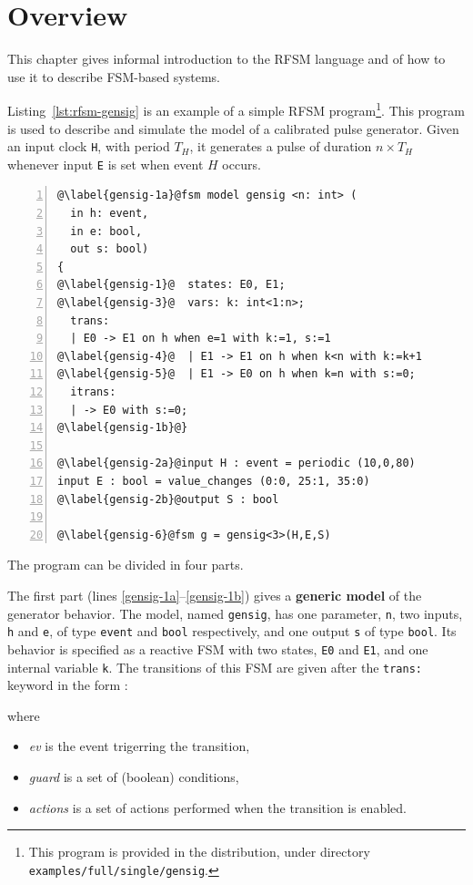 \chapter{Overview}
\label{cha:overview}

This chapter gives informal introduction to the RFSM language and of how to use it to describe 
FSM-based systems.

\medskip
Listing~\ref{lst:rfsm-gensig} is an example of a simple RFSM program\footnote{This program is
  provided in the distribution, under directory \texttt{examples/full/single/gensig}.}. This program is
used to describe and simulate the model of a calibrated pulse generator. Given an input clock
\verb|H|, with period $T_H$, it generates a pulse of duration $n \times T_H$ whenever input
\texttt{E} is set when event $H$ occurs.

\begin{lstlisting}[language=Rfsm,frame=single,numbers=left,caption=A simple RFSM
  program,label={lst:rfsm-gensig}]
@\label{gensig-1a}@fsm model gensig <n: int> (
  in h: event,
  in e: bool,
  out s: bool)
{
@\label{gensig-1}@  states: E0, E1;
@\label{gensig-3}@  vars: k: int<1:n>;
  trans:
  | E0 -> E1 on h when e=1 with k:=1, s:=1
@\label{gensig-4}@  | E1 -> E1 on h when k<n with k:=k+1
@\label{gensig-5}@  | E1 -> E0 on h when k=n with s:=0;
  itrans:
  | -> E0 with s:=0;
@\label{gensig-1b}@}

@\label{gensig-2a}@input H : event = periodic (10,0,80)
input E : bool = value_changes (0:0, 25:1, 35:0)
@\label{gensig-2b}@output S : bool 

@\label{gensig-6}@fsm g = gensig<3>(H,E,S)
\end{lstlisting}

\medskip
The program can be divided in four parts.

\medskip The first part (lines \ref{gensig-1a}--\ref{gensig-1b}) gives a \textbf{generic model} of
the generator behavior. The model, named \verb|gensig|, has one parameter, \verb|n|, two inputs,
\verb|h| and \verb|e|, of type \verb|event| and \verb|bool| respectively, and one output \verb|s| of
type \verb|bool|. Its behavior is specified as a reactive FSM with two states, \verb|E0| and
\verb|E1|, and one internal variable \verb|k|. The transitions of this FSM are given after the
\verb|trans:| keyword in the form :
\begin{center}
\end{center}
where
\begin{itemize}
\item \emph{ev} is the event trigerring the transition,
\item \emph{guard} is a set of (boolean) conditions,
\item \emph{actions} is a set of actions performed when the transition is enabled.
\end{itemize}


